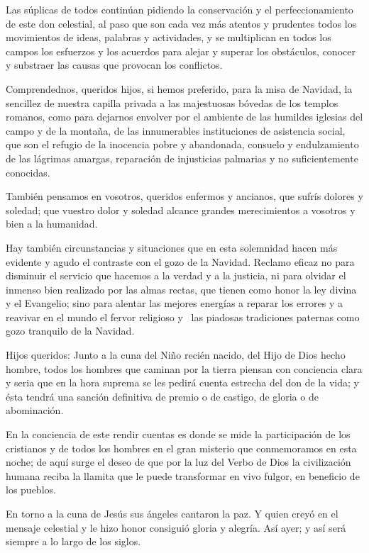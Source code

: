 Las súplicas de todos continúan pidiendo la conservación y el perfeccionamiento de este don celestial, al paso que son cada vez más atentos y prudentes todos los movimientos de ideas, palabras y actividades, y se multiplican en todos los campos los esfuerzos y los acuerdos para alejar y superar los obstáculos, conocer y substraer las causas que provocan los conflictos.

Comprendednos, queridos hijos, si hemos preferido, para la misa de Navidad, la sencillez de nuestra capilla privada a las majestuosas bóvedas de los templos romanos, como para dejarnos envolver por el ambiente de las humildes iglesias del campo y de la montaña, de las innumerables instituciones de asistencia social, que son el refugio de la inocencia pobre y abandonada, consuelo y endulzamiento de las lágrimas amargas, reparación de injusticias palmarias y no suficientemente conocidas.

También pensamos en vosotros, queridos enfermos y ancianos, que sufrís dolores y soledad; que vuestro dolor y soledad alcance grandes merecimientos a vosotros y bien a la humanidad.

Hay también circunstancias y situaciones que en esta solemnidad hacen más evidente y agudo el contraste con el gozo de la Navidad. Reclamo eficaz no para disminuir el servicio que hacemos a la verdad y a la justicia, ni para olvidar el inmenso bien realizado por las almas rectas, que tienen como honor la ley divina y el Evangelio; sino para alentar las mejores energías a reparar los errores y a reavivar en el mundo el fervor religioso y~ las piadosas tradiciones paternas como gozo tranquilo de la Navidad.

Hijos queridos: Junto a la cuna del Niño recién nacido, del Hijo de Dios hecho hombre, todos los hombres que caminan por la tierra piensan con conciencia clara y seria que en la hora suprema se les pedirá cuenta estrecha del don de la vida; y ésta tendrá una sanción definitiva de premio o de castigo, de gloria o de abominación.

En la conciencia de este rendir cuentas es donde se mide la participación de los cristianos y de todos los hombres en el gran misterio que conmemoramos en esta noche; de aquí surge el deseo de que por la luz del Verbo de Dios la civilización humana reciba la llamita que le puede transformar en vivo fulgor, en beneficio de los pueblos.

En torno a la cuna de Jesús sus ángeles cantaron la paz. Y quien creyó en el mensaje celestial y le hizo honor consiguió gloria y alegría. Así ayer; y así será siempre a lo largo de los siglos.


